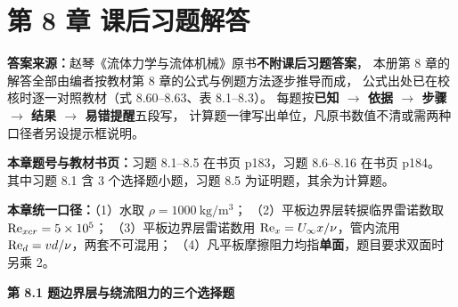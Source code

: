 \chapter*{第 8 章 课后习题解答}


\begin{tishi}
\textbf{答案来源：}赵琴《流体力学与流体机械》原书\textbf{不附课后习题答案}，
本册第 8 章的解答全部由编者按教材第 8 章的公式与例题方法逐步推导而成，
公式出处已在校核时逐一对照教材（式 8.60--8.63、表 8.1--8.3）。
每题按\textbf{已知 $\to$ 依据 $\to$ 步骤 $\to$ 结果 $\to$ 易错提醒}五段写，
计算题一律写出单位，凡原书数值不清或需两种口径者另设提示框说明。

\textbf{本章题号与教材书页：}习题 8.1--8.5 在书页 p183，习题 8.6--8.16 在书页 p184。
其中习题 8.1 含 3 个选择题小题，习题 8.5 为证明题，其余为计算题。

\textbf{本章统一口径：}（1）水取 $\rho=1000\ \mathrm{kg/m^3}$；
（2）平板边界层转捩临界雷诺数取 $\mathrm{Re}_{xcr}=5\times10^5$；
（3）平板边界层雷诺数用 $\mathrm{Re}_x=U_\infty x/\nu$，管内流用 $\mathrm{Re}_d=vd/\nu$，两套不可混用；
（4）凡平板摩擦阻力均指\textbf{单面}，题目要求双面时另乘 2。
\end{tishi}

\noindent\textbf{第 8.1 题\quad 边界层与绕流阻力的三个选择题}

